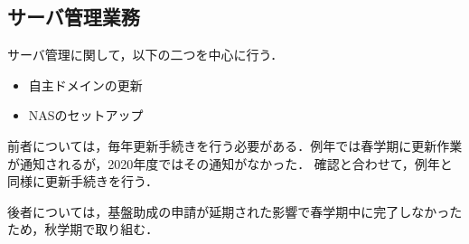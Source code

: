 \subsection*{サーバ管理業務}

サーバ管理に関して，以下の二つを中心に行う．
\begin {itemize}
	\item 自主ドメインの更新
	\item NASのセットアップ
\end {itemize}

前者については，毎年更新手続きを行う必要がある．例年では春学期に更新作業が通知されるが，2020年度ではその通知がなかった．
確認と合わせて，例年と同様に更新手続きを行う．

後者については，基盤助成の申請が延期された影響で春学期中に完了しなかったため，秋学期で取り組む．
